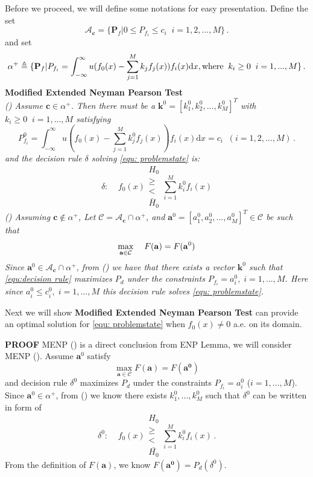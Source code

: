 Before we proceed, we will define some notations for easy presentation.
Define the set 
\[\mathcal{A}_\mathbf{c} = \{
  \mathbf{P}_f | 0 \leq P_{f_i} \leq c_i
  \;\;i=1, 2, ..., M\}\,.
\]
and set 
\[
\alpha^+ \triangleq \{\mathbf{P}_f | P_{f_i} = \int_{-\infty}^{\infty} u(f_0(x) - \sum_{j=1}^{M}k_j f_j(x)) f_i(x) \mathrm{d}x, \text{where\;\;} k_i \geq 0 \;\;i=1, ..., M\}\,.
\]
\noindent \textbf{Modified Extended Neyman Pearson Test}
\noindent \textit{
\\\textnormal{()} Assume $\mathbf{c} \in \alpha^+$. Then there must be a $\mathbf{k}^0 = [k_1^0, k_2^0, ..., k_M^0]^T$ with $k_i \geq 0\;\;i=1, ..., M$ satisfying
}
\begin{equation}
\label{equ:Pf}
  P_{f_i}^0 = \int_{-\infty}^{\infty} u(f_0(x) - \sum_{j=1}^{M}k_j^0f_j(x))f_i(x)\mathrm{d}x = c_i \;\; (i= 1, 2, ..., M)\,.
\end{equation}
\textit{
    and the decision rule $\delta $ solving  \eqref{equ: problemstate} is:
}
\begin{equation}
\label{equ:decision rule}
\delta:\;\;\;\;f_0(x) \substack{H_0 \\ \geq \\ < \\ \bar{H}_0} \sum_{i=1}^{M}k_i^0f_i(x)
\end{equation}
\textit{
\noindent \textnormal{()} Assuming $\mathbf{c} \notin \alpha^+$, Let $\mathcal{C} = \mathcal{A}_{\mathbf{c}} \cap \alpha^+$, and $\mathbf{a}^0 = [a_1^0, a_2^0, ..., a_M^0]^T \in \mathcal{C}$ be such that
}
\begin{equation}
\label{equ: F0}
\max_{\mathbf{a} \in \mathcal{C}}\;\;\;\;F(\mathbf{a}) = F(\mathbf{a}^0)\\
\end{equation}
\textit{
Since $\mathbf{a}^0 \in \mathcal{A}_{\mathbf{c}} \cap \alpha^+$, from \textnormal{()} we have that there exists a vector $\mathbf{k}^0$ such that \eqref{equ:decision rule}  maximizes $P_d$ under the constraints $P_{f_i} = a_i^0, \;i=1, ..., M$. Here since $a_i^0 \leq c_i^0, \;i=1, ..., M$ this decision rule  solves \eqref{equ: problemstate}.
}

Next we will show \textbf{Modified Extended Neyman Pearson Test} can provide an optimal solution for \eqref{equ: problemstate} when $f_0(x) \neq 0$ a.e. on its domain.

\textbf{PROOF}
MENP () is a direct conclusion from ENP Lemma, we will consider MENP (). Assume $\mathbf{a}^0$ satisfy
\begin{equation}
\label{a0}
\max_{\mathbf{a}\in\mathcal{C}} F(\mathbf{a}) = F(\mathbf{a^0})
\end{equation}
and decision rule $\delta^0$ maximizes $P_d$ under the constraints $P_{f_i} = a^0_i$ ($i = 1, ..., M$). Since $\mathbf{a}^0 \in \alpha^+$, from () we know there exists $k_1^0, ..., k_M^0$ such that $\delta^0$ can be written in form of 
\[
\delta^0:\;\;\;\;f_0(x) \substack{H_0 \\ \geq \\ < \\ \bar{H_0}} \sum_{i=1}^{M}k_i^0f_i(x)\,.
\] 
From the definition of $F(\mathbf{a})$, we know $F(\mathbf{a^0}) = P_d(\delta^0)$.


